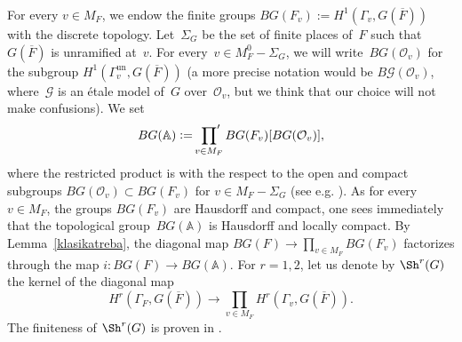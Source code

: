 \documentclass[a4paper,english,12pt]{amsart}
\newcommand{\GG}{ G}
\newcommand{\oF}{\overline F}
\newcommand{\Ov}{\mathcal O _v}
\newcommand{\vMF}{v\in M_F}
\newcommand{\vMFz}{v\in M_F ^0}
\newcommand{\AAA}{\mathbb A}
\DeclareMathOperator{\Spec}{Spec}
\DeclareMathOperator{\fppf}{fppf}
\DeclareMathOperator{\un}{un}
\newtheorem{prop}[equation]{Proposition}
\numberwithin{equation}{subsection}
\begin{document}
\subsubsection{}For every $v\in M_F$, we endow the finite groups $BG(F_v):=H^1(\Gamma_v, G(\oF))$ with the discrete topology. Let~$\Sigma_G$ be the set of finite places of~$F$ such that~$G(\oF)$ is unramified at~$v$. For every~$v\in M_F^0-\Sigma_G$, we will write~$BG(\Ov)$ for the subgroup $H^1(\Gamma_v^{\un}, G(\oF))$ (a more precise notation would be $B\mathcal G(\Ov)$, where~$\mathcal G$ is an \' etale model of~$G$ over~$\Ov$, but we think that our choice will not make confusions).  %
We set $$BG(\AAA):=\sideset{}{'}\prod_{v\in M_F}BG(F_v)[BG(\Ov)] ,$$ where the restricted product is with the respect to the open and compact subgroups $BG(\Ov)\subset BG(F_v)$ for $v\in M_F-\Sigma_G$ (see e.g. \cite[Chapter VIII, \S 6]{CohomologyNF}). 
As for every~$\vMF$, the groups $BG(F_v)$ are Hausdorff and compact, one sees immediately that the topological group~$BG(\AAA)$ is Hausdorff and locally compact. By Lemma~\ref{klasikatreba}, the diagonal map $BG(F)\to\prod_{\vMF}BG(F_v)$ factorizes through the map $i:BG(F)\to BG(\AAA).$
For $r=1,2$, let us denote by $\Sh^r(G)$ the kernel of the diagonal map $$H^r(\Gamma_F, G(\oF))\to \prod_{v\in M_F}H^r(\Gamma_v,G(\oF)).$$ The finiteness of $\Sh^r(G)$ is proven in \cite[Chapter I, Theorem 4.10]{ArithmeticDuality}.
\end{document}
